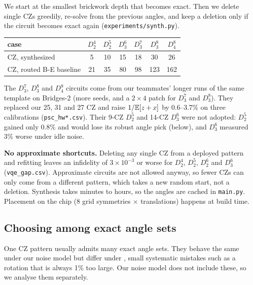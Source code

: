 \documentclass[11pt]{scrartcl}
\newcommand{\D}[2]{D^{#1}_{#2}}
\newcommand{\CZ}{\ensuremath{\mathrm{CZ}}}
\newcommand{\file}[1]{\texttt{\small #1}}
\begin{document}
We start at the smallest brickwork depth that becomes exact. Then we delete single \CZ{}s greedily,
re-solve from the previous angles, and keep a deletion only if the circuit becomes exact again
(\file{experiments/synth.py}).

\begin{center}\small
\begin{tabular}{lcccccc}
  \toprule
  case & $\D42$ & $\D52$ & $\D63$ & $\D73$ & $\D83$ & $\D84$\\
  \midrule
  CZ, synthesized & 5 & 10 & 15 & 18 & 30 & 26\\
  CZ, routed B-E baseline & 21 & 35 & 80 & 98 & 123 & 162\\
  \bottomrule
\end{tabular}
\end{center}

The $\D73$, $\D83$ and $\D84$ circuits come from our teammates' longer runs of the same template on
Bridges-2 (more seeds, and a $2\times4$ patch for $\D73$ and $\D83$). They replaced our 25, 31 and
27 \CZ{} and raise $1/\mathbb E[z+x]$ by 0.6--3.7\% on three calibrations (\file{psc\_hw*.csv}). Their
9-\CZ{} $\D52$ and 14-\CZ{} $\D63$ were not adopted: $\D52$ gained only 0.8\% and would lose its
robust angle pick (below), and $\D63$ measured 3\% worse under idle noise.

\textbf{No approximate shortcuts.} Deleting any single \CZ{} from a deployed pattern and
refitting leaves an infidelity of $3\times10^{-3}$ or worse for $\D42$, $\D52$, $\D62$ and $\D63$
(\file{vqe\_gap.csv}). Approximate circuits are not allowed anyway, so fewer \CZ{}s can only come
from a different pattern, which takes a new random start, not a deletion. Synthesis takes minutes
to hours, so the angles are cached in \file{main.py}. Placement on the chip (8 grid symmetries
$\times$ translations) happens at build time.

\subsection{Choosing among exact angle sets}

One \CZ{} pattern usually admits many exact angle sets. They behave the same under our noise model
but differ under , small systematic mistakes such as a rotation that is
always 1\% too large. Our noise model does not include these, so we analyse them separately.
\end{document}
